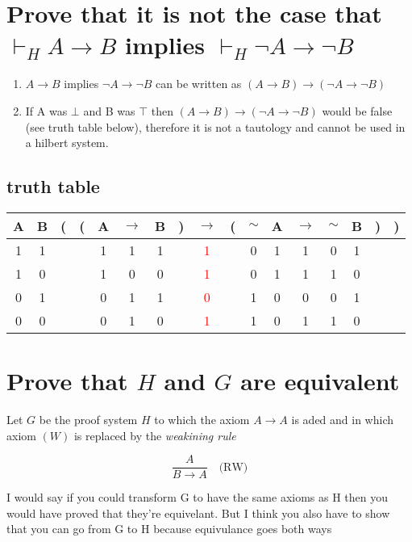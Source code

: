 \documentclass{article}
\begin{document}
\section{Prove that it is not the case that $\vdash_H A \to B$ implies 
$ \vdash_H \neg A \to \neg B$}

\begin{enumerate}
	\item $A \to B$ implies $\neg A \to \neg B$ can be written as 
		$(A \to B) \to (\neg A \to \neg B)$
	\item If A was $\bot$ and B was $\top$ then $(A \to B) \to (\neg A \to 
		\neg B)$ would be false (see truth table below), therefore it is not a tautology and cannot
		be used in a hilbert system.
\end{enumerate}
\subsection{truth table}
\begin{tabular}{@{ }c@{ }@{ }c | c@{}@{}c@{}@{ }c@{ }@{ }c@{ }@{ }c@{ }@{}c@{}@{ }c@{ }@{}c@{}@{ }c@{ }@{ }c@{ }@{ }c@{ }@{ }c@{ }@{ }c@{ }@{}c@{}@{}c@{ }}
A & B & ( & ( & A & $\rightarrow$ & B & ) & $\rightarrow$ & ( & $\sim$ & A & $\rightarrow$ & $\sim$ & B & ) & )\\
\hline 
1 & 1 &  &  & 1 & 1 & 1 &  & \textcolor{red}{1} &  & 0 & 1 & 1 & 0 & 1 &  & \\
1 & 0 &  &  & 1 & 0 & 0 &  & \textcolor{red}{1} &  & 0 & 1 & 1 & 1 & 0 &  & \\
0 & 1 &  &  & 0 & 1 & 1 &  & \textcolor{red}{0} &  & 1 & 0 & 0 & 0 & 1 &  & \\
0 & 0 &  &  & 0 & 1 & 0 &  & \textcolor{red}{1} &  & 1 & 0 & 1 & 1 & 0 &  & \\
\end{tabular}

\section{Prove that $H$ and $G$ are equivalent}
Let $G$ be the proof system $H$ to which the axiom $A \to A$ 
is aded and in which axiom $(W)$ is replaced by the \emph{weakining rule}

\[\frac{A}{B \to A}\quad\text{(RW)} \]

I would say if you could transform G to have the same
axioms as H then you would have proved that they're equivelant. But I think
you also have to show that you can go from G to H because equivulance goes both
ways
\end{document}
